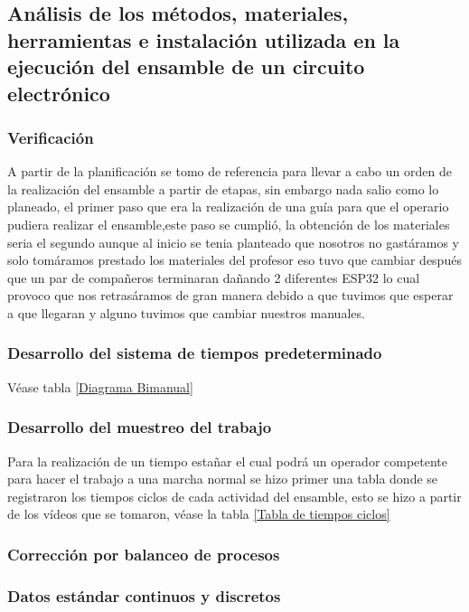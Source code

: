     \subsection{Análisis de los métodos, materiales, herramientas e instalación utilizada en la ejecución del ensamble de un circuito electrónico}
    
    \subsubsection{Verificación}
    A partir de la planificación se tomo de referencia para llevar a cabo un orden de la realización del ensamble a partir de etapas, sin embargo nada salio como lo planeado, el primer paso que era la realización de una guía para que el operario pudiera realizar el ensamble,este paso se cumplió, la obtención de los materiales seria el segundo aunque al inicio se tenia planteado que nosotros no gastáramos y solo tomáramos prestado los materiales del profesor eso tuvo que cambiar después que un par de compañeros terminaran dañando 2 diferentes ESP32 lo cual provoco que nos retrasáramos de gran manera debido a que tuvimos que esperar a que llegaran y alguno tuvimos que cambiar nuestros manuales.
    \subsubsection{Desarrollo del sistema de tiempos predeterminado}
    Véase tabla \ref{Diagrama Bimanual}
    \subsubsection{Desarrollo del muestreo del trabajo}
    Para la realización de un tiempo estañar el cual podrá un operador competente para hacer el trabajo a una marcha normal se hizo primer una tabla donde se registraron los tiempos ciclos de cada actividad del ensamble, esto se hizo a partir de los vídeos que se tomaron, véase la tabla \ref{Tabla de tiempos ciclos}
    \subsubsection{Corrección por balanceo de procesos}
    \subsubsection{Datos estándar continuos y discretos}
